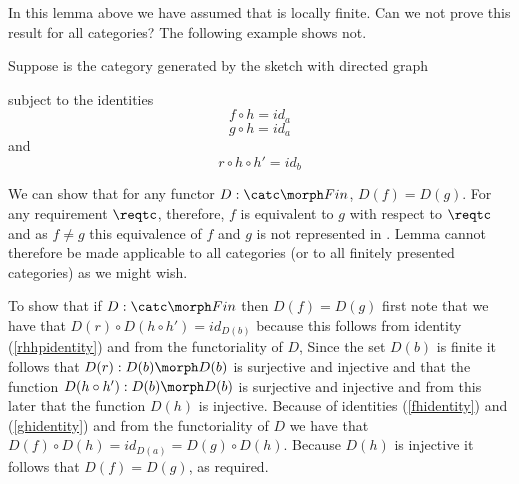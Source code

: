 In this lemma above we have assumed that \catcw is locally finite. Can we not prove this result for all categories? The following example shows not. 
\begin{example}
Suppose \catcw is the category generated by the sketch with directed graph

subject to the identities
\begin{equation}
\label{fhidentity}
f \circ h = id_a
\end{equation}
\begin{equation}
\label{ghidentity}
g \circ h = id_a
\end{equation}
and 
\begin{equation}
\label{rhhpidentity}
r \circ h \circ h' = id_b
\end{equation}

We can show that for any functor $D:\catc \morph Fin$, $D(f)=D(g)$. For any requirement 
$\reqtc$, therefore, $f$ is equivalent to $g$ with respect to $\reqtc$ and as $f \neq g$ this equivalence of $f$ and $g$ 
is not represented in \catc. Lemma  cannot therefore be made applicable to all categories (or to all finitely presented categories) as we might wish.

To show that if $D:\catc \morph Fin$ then $D(f)=D(g)$ 
first note that we have that $D(r) \circ D(h \circ h')=id_{D(b)}$ because this follows from
identity (\ref {rhhpidentity}) and from the functoriality of $D$, Since 
the set $D(b)$ is finite it follows that $D(r): D(b) \morph D(b)$ is surjective and injective 
and that the function $D(h \circ h'):D(b) \morph D(b)$ is surjective and injective and from this later
that the function $D(h)$ is injective.
Because of identities (\ref{fhidentity}) and (\ref{ghidentity}) and from the 
functoriality of $D$ we have that $D(f) \circ D(h) =id_{D(a)}=D(g) \circ D(h)$. Because $D(h)$ is injective it follows 
that $D(f)=D(g)$, as required.
\end{example}


